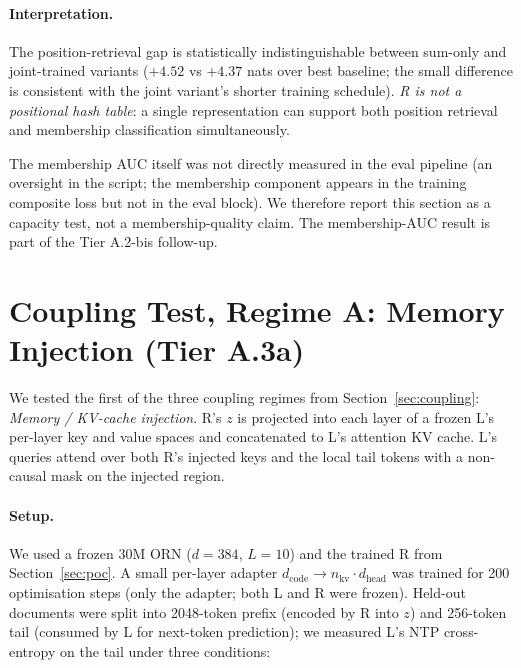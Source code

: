 \documentclass[10pt, twocolumn, a4paper]{article}
\begin{document}
\paragraph{Interpretation.} The position-retrieval gap is statistically
indistinguishable between sum-only and joint-trained variants
($+4.52$ vs $+4.37$ nats over best baseline; the small difference is
consistent with the joint variant's shorter training schedule). \emph{R is
not a positional hash table}: a single representation can support both
position retrieval and membership classification simultaneously.

The membership AUC itself was not directly measured in the eval pipeline
(an oversight in the script; the membership component appears in the
training composite loss but not in the eval block). We therefore report
this section as a capacity test, not a membership-quality claim. The
membership-AUC result is part of the Tier A.2-bis follow-up.


\section{Coupling Test, Regime A: Memory Injection (Tier A.3a)}
\label{sec:regime_a}

We tested the first of the three coupling regimes from Section~\ref{sec:coupling}: \emph{Memory / KV-cache injection}. R's $z$ is projected into each layer of a frozen L's per-layer key and value spaces and concatenated to L's attention KV cache. L's queries attend over both R's injected keys and the local tail tokens with a non-causal mask on the injected region.

\paragraph{Setup.} We used a frozen 30M ORN ($d{=}384$, $L{=}10$) and the
trained R from Section~\ref{sec:poc}. A small per-layer adapter
$d_{\text{code}} \to n_{\text{kv}} \cdot d_{\text{head}}$ was trained for
200 optimisation steps (only the adapter; both L and R were frozen).
Held-out documents were split into 2048-token prefix (encoded by R into
$z$) and 256-token tail (consumed by L for next-token prediction); we
measured L's NTP cross-entropy on the tail under three conditions:
\end{document}
